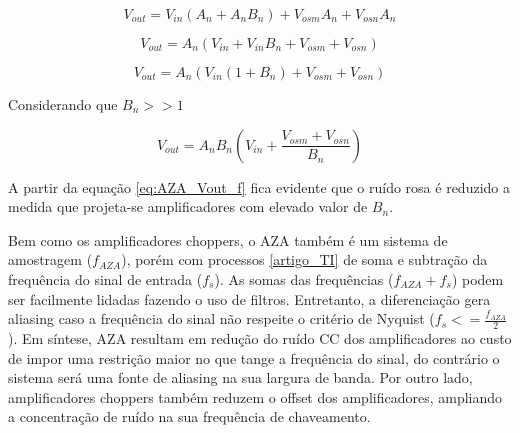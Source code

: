 \documentclass[oneside,openright,12pt]{ufsm_2021} %
\begin{document}
            \begin{equation}
                V_{out}=V_{in}(A_{n}+A_{n}B_{n}) + V_{osm}A_{n}+ V_{osn}A_{n}
            \end{equation}

            \begin{equation}
            \label{eq:AZA_Vout}
                V_{out}=A_{n}(V_{in}+V_{in}B_{n} + V_{osm}+ V_{osn})
            \end{equation}

            \begin{equation}
                V_{out}=A_{n}(V_{in}(1+B_{n}) + V_{osm}+ V_{osn})
            \end{equation}

            \par Considerando que $B_{n}>>1$

            \begin{equation}
            \label{eq:AZA_Vout_f}
                V_{out}=A_{n}B_{n}(V_{in} + \frac{V_{osm}+ V_{osn}}{B_{n}})
            \end{equation}

            \par A partir da equação \ref{eq:AZA_Vout_f} fica evidente que o ruído rosa é reduzido a medida que projeta-se amplificadores com elevado valor de $B_{n}$.
            
            \par Bem como os amplificadores choppers, o AZA também é um sistema de amostragem ($f_{AZA}$), porém com processos \ref{artigo_TI} de soma e subtração da frequência do sinal de entrada ($f_{s}$). As somas das frequências ($f_{AZA}+f_{s}$) podem ser facilmente lidadas fazendo o uso de filtros. Entretanto, a diferenciação gera aliasing caso a frequência do sinal não respeite o critério de Nyquist ($f_{s} <= \frac{f_{AZA}}{2}$). Em síntese, AZA resultam em redução do ruído CC dos amplificadores ao custo de impor uma restrição maior no que tange a frequência do sinal, do contrário o sistema será uma fonte de aliasing na sua largura de banda. Por outro lado, amplificadores choppers também reduzem o offset dos amplificadores, ampliando a concentração de ruído na sua frequência de chaveamento. 

\end{document}
